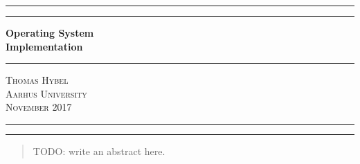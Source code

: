 \documentclass{report}
\begin{document}


\begin{titlepage} %

\centering %

\rule{\textwidth}{1pt} %
\vspace{2pt}\vspace{-\baselineskip} %
\rule{\textwidth}{0.4pt} %
\vspace{0.1\textheight} %

{\Huge \bfseries
Operating System \\ Implementation
}

\vspace{0.010\textheight} %
\rule{0.3\textwidth}{0.4pt} %
\vspace{0.01\textheight} %

{\Large \textsc{Thomas Hybel}} \\[0.5\baselineskip]
{\Large \textsc{Aarhus University}} \\[0.5\baselineskip]
{\Large \textsc{November 2017}} 

\vfill %




\rule{\textwidth}{0.4pt} %
\vspace{2pt}\vspace{-\baselineskip} %
\rule{\textwidth}{1pt} %

\end{titlepage}
\newpage




\begin{abstract} 
\noindent 
TODO: write an abstract here.
\end{abstract}
\newpage


\tableofcontents

\newpage
{}
\end{document}

